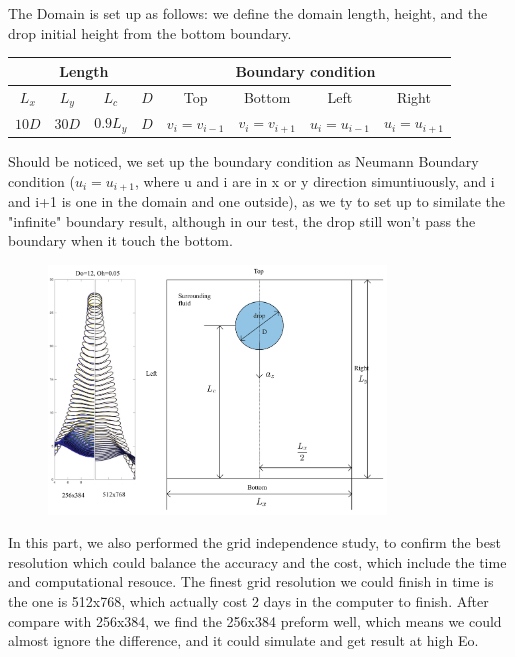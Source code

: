 \documentclass[12pt]{article}
\begin{document}
The Domain is set up as follows: we define the domain length, height, and the drop initial height from the bottom boundary. 



\begin{table}[ht]
\scriptsize
\centering
\renewcommand{\arraystretch}{1.5} %
\begin{tabular}{|c|c|c|c|c|c|c|c|}
\hline
\multicolumn{4}{|c|}{\textbf{Length}} & \multicolumn{4}{c|}{\textbf{Boundary condition}} \\
\hline
$L_x$ & $L_y$ & $L_c$ & $D$   & Top & Bottom & Left & Right \\
\hline
$10D$ & $30D$ & $0.9L_y$ & $D$   & $v_{i} = v_{i-1}$ & $v_i = v_{i+1}$ & $u_i = u_{i-1}$ & $u_i = u_{i+1}$ \\
\hline
\end{tabular}
\end{table}


Should be noticed, we set up the boundary condition as Neumann Boundary condition ($u_i = u_{i+1}$, where u and i are in x or y direction simuntiuously, and i and i+1 is one in the domain and one outside), as we ty to set up to similate the "infinite" boundary result, although in our test, the drop still won't pass the boundary when it touch the bottom. 
\begin{figure}[H]
    \centering
    \includegraphics[width=0.8\textwidth]{Latex/figures/Domain_grid_indep.jpg}
    \label{deformation}
\end{figure}


In this part, we also performed the grid independence study, to confirm the best resolution which could balance the accuracy and the cost, which include the time and computational resouce. The finest grid resolution we could finish in time is the one is 512x768, which actually cost 2 days in the computer to finish. After compare with 256x384, we find the 256x384 preform well, which means we could almost ignore the difference, and it could simulate and get result at high Eo.
\end{document}
